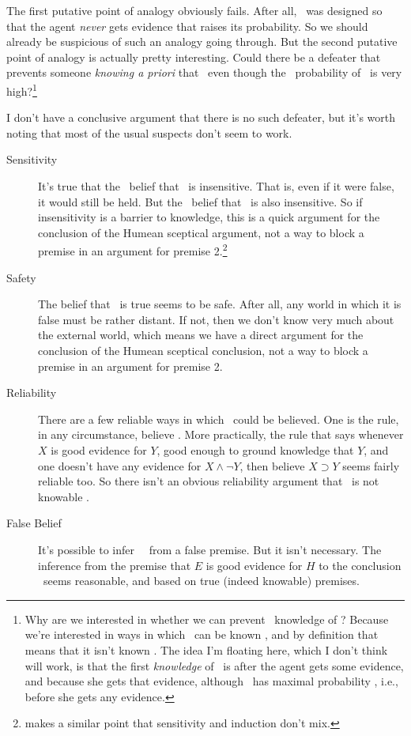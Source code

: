 The first putative point of analogy obviously fails. After all, \ECH\ was designed so that the agent \textit{never} gets evidence that raises its probability. So we should already be suspicious of such an analogy going through. But the second putative point of analogy is actually pretty interesting. Could there be a defeater that prevents someone \textit{knowing a priori} that \ECH\ even though the \apr\ probability of \ECH\ is very high?\footnote{Why are we interested in whether we can prevent \apr\ knowledge of \ECH? Because we're interested in ways in which \ECH\ can be known \apo, and by definition that means that it isn't known \apr. The idea I'm floating here, which I don't think will work, is that the first \textit{knowledge} of \ECH\ is after the agent gets some evidence, and because she gets that evidence, although \ECH\ has maximal probability \apr, i.e., before she gets any evidence.}

I don't have a conclusive argument that there is no such defeater, but it's worth noting that most of the usual suspects don't seem to work.

\begin{description}
\item[Sensitivity] It's true that the \apr\ belief that \ECH\ is insensitive. That is, even if it were false, it would still be held. But the \apo\ belief that \ECH\ is also insensitive. So if insensitivity is a barrier to knowledge, this is a quick argument for the conclusion of the Humean sceptical argument, not a way to block a premise in an argument for premise 2.\footnote{\citet{Vogel1987} makes a similar point that sensitivity and induction don't mix.}
\item[Safety] The belief that \ECH\ is true seems to be safe. After all, any world in which it is false must be rather distant. If not, then we don't know very much about the external world, which means we have a direct argument for the conclusion of the Humean sceptical conclusion, not a way to block a premise in an argument for premise 2.
\item[Reliability] There are a few reliable ways in which \ECH\ could be believed. One is the rule, in any circumstance, believe \ECH. More practically, the rule that says whenever $X$ is good evidence for $Y$, good enough to ground knowledge that $Y$, and one doesn't have any evidence for $X \wedge \neg Y$, then believe $X \supset Y$ seems fairly reliable too. So there isn't an obvious reliability argument that \ECH\ is not knowable \apr.
\item[False Belief] It's possible to infer \ECH\ \apr\ from a false premise. But it isn't necessary. The inference from the premise that $E$ is good evidence for $H$ to the conclusion \ECH\ seems reasonable, and based on true (indeed knowable) premises.
\end{description}

